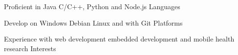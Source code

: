 \begin{cvhonors}

    \cvhonor
      {Proficient in Java}
      {C/C++, Python and Node.js}
      {}
      {Languages}
      
        \cvhonor
      {Develop on Windows}
      {Debian Linux and with Git}
      {}
      {Platforms  }
      
    \cvhonor
      {Experience with web development}
      {embedded development and mobile health research}
      {}
      {Interests      }


\end{cvhonors}
